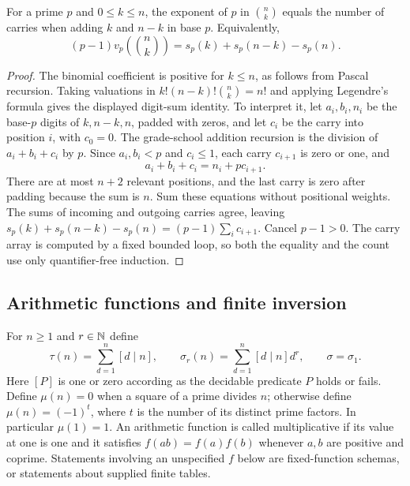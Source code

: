 \begin{theorem}\label{el:kummer}
For a prime $p$ and $0\le k\le n$, the exponent of $p$ in
$\binom nk$ equals the number of carries when adding $k$ and $n-k$
in base $p$.  Equivalently,
\[
 (p-1)v_p\!\left(\binom nk\right)
     =s_p(k)+s_p(n-k)-s_p(n).
\]
\end{theorem}
\begin{proof}
The binomial coefficient is positive for $k\le n$, as follows from
Pascal recursion.  Taking valuations in
$k!(n-k)!\binom nk=n!$ and applying Legendre's formula gives the
displayed digit-sum identity.  To interpret it, let $a_i,b_i,n_i$
be the base-$p$ digits of $k,n-k,n$, padded with zeros, and let
$c_i$ be the carry into position $i$, with $c_0=0$.
The grade-school addition recursion is the division of
$a_i+b_i+c_i$ by $p$.  Since $a_i,b_i<p$ and $c_i\le1$, each carry
$c_{i+1}$ is zero or one, and
\[
                 a_i+b_i+c_i=n_i+p c_{i+1}.
\]
There are at most $n+2$ relevant positions, and the last carry is
zero after padding because the sum is $n$.  Sum these equations
without positional weights.  The sums of incoming and outgoing
carries agree, leaving
$s_p(k)+s_p(n-k)-s_p(n)=(p-1)\sum_i c_{i+1}$.
Cancel $p-1>0$.  The carry array is computed by a fixed bounded loop,
so both the equality and the count use only quantifier-free induction.
\end{proof}

\subsection{Arithmetic functions and finite inversion}

For $n\ge1$ and $r\in\mathbb N$ define
\[
 \tau(n)=\sum_{d=1}^n[d\mid n],\qquad
 \sigma_r(n)=\sum_{d=1}^n[d\mid n]d^r,\qquad \sigma=\sigma_1.
\]
Here $[P]$ is one or zero according as the decidable predicate $P$
holds or fails.  Define $\mu(n)=0$ when a square of a prime divides
$n$; otherwise define $\mu(n)=(-1)^t$, where $t$ is the number of
its distinct prime factors.  In particular $\mu(1)=1$.
An arithmetic function is called multiplicative if its value at one
is one and it satisfies $f(ab)=f(a)f(b)$ whenever $a,b$ are positive
and coprime.  Statements involving an unspecified $f$ below are
fixed-function schemas, or statements about supplied finite tables.

